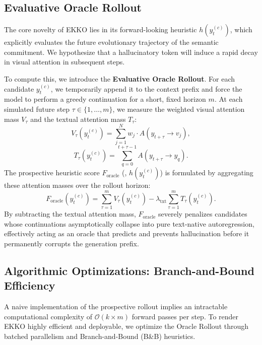 \subsection{Evaluative Oracle Rollout}
\label{sec:oracle}

The core novelty of EKKO lies in its forward-looking heuristic $h(y_t^{(c)})$, which explicitly evaluates the future evolutionary trajectory of the semantic commitment. We hypothesize that a hallucinatory token will induce a rapid decay in visual attention in subsequent steps.

To compute this, we introduce the \textbf{Evaluative Oracle Rollout}. For each candidate $y_t^{(c)}$, we temporarily append it to the context prefix and force the model to perform a greedy continuation for a short, fixed horizon $m$. At each simulated future step $\tau \in \{1, \dots, m\}$, we measure the weighted visual attention mass $V_\tau$ and the textual attention mass $T_\tau$:
\begin{equation}
    V_\tau(y_t^{(c)}) = \sum_{j=1}^{N} w_j \cdot A(y_{t+\tau} \to v_j),
\end{equation}
\begin{equation}
    T_\tau(y_t^{(c)}) = \sum_{q=0}^{t+\tau-1} A(y_{t+\tau} \to y_q).
\end{equation}
The prospective heuristic score $F_{\mathrm{oracle}}$ (\ie, $h(y_t^{(c)})$) is formulated by aggregating these attention masses over the rollout horizon:
\begin{equation}
    F_{\mathrm{oracle}}(y_t^{(c)}) = \sum_{\tau=1}^{m} V_\tau(y_t^{(c)}) - \lambda_{\mathrm{txt}} \sum_{\tau=1}^{m} T_\tau(y_t^{(c)}).
\end{equation}
By subtracting the textual attention mass, $F_{\mathrm{oracle}}$ severely penalizes candidates whose continuations asymptotically collapse into pure text-native autoregression, effectively acting as an oracle that predicts and prevents hallucination before it permanently corrupts the generation prefix.

\subsection{Algorithmic Optimizations: Branch-and-Bound Efficiency}
\label{sec:bb}

A naive implementation of the prospective rollout implies an intractable computational complexity of $\mathcal{O}(k \times m)$ forward passes per step. To render EKKO highly efficient and deployable, we optimize the Oracle Rollout through batched parallelism and Branch-and-Bound (B\&B) heuristics.

